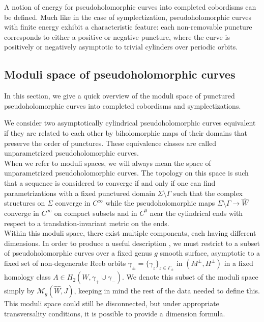 \documentclass[11pt, a4paper]{amsart}
\newcommand{\cM}{\mathcal{M}}
\begin{document}
A notion of energy for pseudoholomorphic curves into completed cobordisms can be defined. Much like in the case of symplectization, pseudoholomorphic curves with finite energy exhibit a characteristic feature: each non-removable puncture corresponds to either a positive or negative puncture, where the curve is positively or negatively asymptotic to trivial cylinders over periodic orbits.

\subsection{Moduli space of pseudoholomorphic curves} \label{Moduli space of pseudoholomorphic curves}
In this section, we give a quick overview of the moduli space of punctured pseudoholomorphic curves into completed cobordisms and symplectizations.\\
\vspace{1pt}

We consider two asymptotically cylindrical pseudoholomorphic curves equivalent if they are related to each other by biholomorphic maps of their domains that preserve the order of punctures. These  equivalence classes are called unparametrized pseudoholomorphic curves. \\
When we refer to moduli spaces, we will always mean the space of unparametrized pseudoholomorphic curves. The topology on this space is such that a sequence  is considered to converge if and only if one can find parametrizations with a fixed punctured domain $\Sigma\setminus \Gamma$ such that the complex structures on $\Sigma$ converge in $C^{\infty}$ while the pseudoholomorphic maps $\Sigma\setminus \Gamma \rightarrow \widehat{W}$ converge in $C^{\infty}$ on compact subsets and in $C^0$ near the cylindrical ends with respect to a translation-invariant metric on the
ends.\\

Within this moduli space, there exist multiple components, each having different dimensions. In order to produce a useful description , we must restrict to a subset of pseudoholomorphic curves over a fixed genus $g$ smooth surface, asymptotic to a fixed set of non-degenerate Reeb orbits $\gamma_{\pm}=\{\gamma_z\}_{z \in \Gamma_{\pm}}$ in $(M^{\pm},H^{\pm})$ in a fixed homology class $A\in H_2(W,\gamma_+\cup \gamma_-)$. We denote this subset of the moduli space simply by $\cM_g(\widehat{W},J)$, keeping in mind the rest of the data needed to define this. This moduli space could still be disconnected, but under appropriate transversality conditions, it is possible to provide a dimension formula.\\
\end{document}
